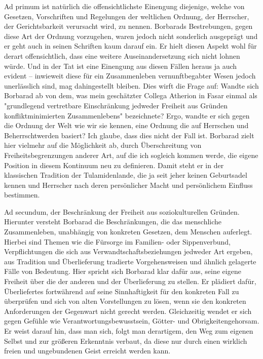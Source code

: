 \documentclass[11pt]{article}
\begin{document}
Ad primum ist natürlich die offensichtlichste Einengung diejenige, welche von Gesetzen, Vorschriften
und Regelungen der weltlichen Ordnung, der Herrscher, der Gerichtsbarkeit verursacht wird, zu nennen.
Borbarads Bestrebungen, gegen diese Art der Ordnung vorzugehen, waren jedoch nicht sonderlich ausgeprägt und er geht auch in seinen Schriften kaum darauf ein. Er hielt diesen Aspekt wohl für derart
offensichtlich, dass eine weitere Auseinandersetzung sich nicht lohnen würde. Und in der Tat ist eine
Einengung aus diesen Fällen heraus ja auch evident – inwieweit diese für ein Zusammenleben vernunftbegabter Wesen jedoch unerlässlich sind, mag dahingestellt bleiben. Dies wirft die Frage auf: Wandte
sich Borbarad ab von dem, was mein geschätzter Collega Atherion in Fasar einmal als "grundlegend
vertretbare Einschränkung jedweder Freiheit aus Gründen konfliktminimierten Zusammenlebens" bezeichnete? Ergo, wandte er sich gegen die Ordnung der Welt wie wir sie kennen, eine Ordnung die auf
Herrschen und Beherrschtwerden basiert? Ich glaube, dass dies nicht der Fall ist. Borbarad zielt hier
vielmehr auf die Möglichkeit ab, durch Überschreitung von Freiheitsbegrenzungen anderer Art, auf die
ich sogleich kommen werde, die eigene Position in diesem Kontinuum neu zu definieren. Damit steht er
in der klassischen Tradition der Tulamidenlande, die ja seit jeher keinen Geburtsadel kennen und Herrscher nach deren persönlicher Macht und persönlichem Einfluss bestimmen.

Ad secundum, der Beschränkung der Freiheit aus soziokulturellen Gründen. Hierunter versteht Borbarad
die Beschränkungen, die das menschliche Zusammenleben, unabhängig von konkreten Gesetzen, dem
Menschen auferlegt. Hierbei sind Themen wie die Fürsorge im Familien- oder Sippenverbund, Verpflichtungen die sich aus Verwandtschaftsbeziehungen jedweder Art ergeben, aus Tradition und Überlieferung
tradierte Vorgehensweisen und ähnlich gelagerte Fälle von Bedeutung. Hier spricht sich Borbarad klar
dafür aus, seine eigene Freiheit über die der anderen und der Überlieferung zu stellen. Er plädiert dafür,
Überliefertes fortwährend auf seine Sinnhaftigkeit für den konkreten Fall zu überprüfen und sich von
alten Vorstellungen zu lösen, wenn sie den konkreten Anforderungen der Gegenwart nicht gerecht werden. Gleichzeitig wendet er sich gegen Gefühle wie Verantwortungsbewusstsein, Götter- und Obrigkeitengehorsam. Er weist darauf hin, dass man sich, folgt man derartigem, den Weg zum eigenen Selbst
und zur größeren Erkenntnis verbaut, da diese nur durch einen wirklich freien und ungebundenen Geist
erreicht werden kann.
\end{document}

